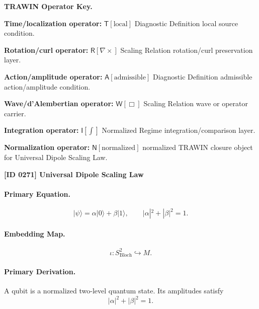 \par\vspace{0.45\baselineskip}
\noindent\begin{minipage}[t]{\linewidth}
\begingroup
\small
\raggedright
\textbf{TRAWIN Operator Key.}\par
\noindent\textbf{Time/localization operator:} $\mathsf{T}\!\left[\mathrm{local}\right]$ Diagnostic Definition local source condition.\par
\noindent\textbf{Rotation/curl operator:} $\mathsf{R}\!\left[\nabla\times\right]$ Scaling Relation rotation/curl preservation layer.\par
\noindent\textbf{Action/amplitude operator:} $\mathsf{A}\!\left[\mathrm{admissible}\right]$ Diagnostic Definition admissible action/amplitude condition.\par
\noindent\textbf{Wave/d'Alembertian operator:} $\mathsf{W}\!\left[\Box\right]$ Scaling Relation wave or operator carrier.\par
\noindent\textbf{Integration operator:} $\mathsf{I}\!\left[\int\right]$ Normalized Regime integration/comparison layer.\par
\noindent\textbf{Normalization operator:} $\mathsf{N}\!\left[\mathrm{normalized}\right]$ normalized TRAWIN closure object for Universal Dipole Scaling Law.\par
\endgroup
\end{minipage}

\clearpage
\noindent\textbf{[ID 0271] Universal Dipole Scaling Law}\par
\vspace{0.35em}
\paragraph{Primary Equation.}
\begin{equation}
|\psi\rangle = \alpha|0\rangle+\beta|1\rangle,
\qquad
|\alpha|^2+|\beta|^2=1 .
\end{equation}

\paragraph{Embedding Map.}
\begin{equation}
\iota:S^2_{\mathrm{Bloch}}\hookrightarrow M .
\end{equation}

\paragraph{Primary Derivation.}
A qubit is a normalized two-level quantum state. Its amplitudes satisfy
\begin{equation}
|\alpha|^2+|\beta|^2=1 .
\end{equation}


